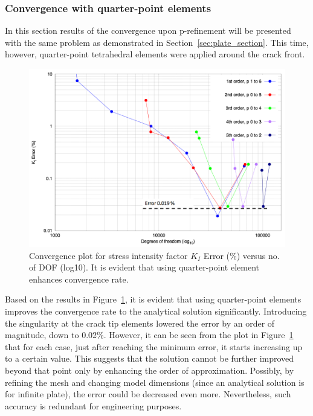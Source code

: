 \documentclass[11pt]{acmeArticle}
\numberwithin{equation}{section}
\begin{document}
\subsubsection{Convergence with quarter-point elements}
In this section results of the convergence upon p-refinement will be presented with the same problem as demonstrated in Section~\ref{sec:plate_section}. 
This time, however, quarter-point tetrahedral elements were applied around the crack front.
\begin{figure}[h!]
	\centering
	\includegraphics[width=0.7\linewidth]{Figures/graphs/plate_conv_singularity.png}
	\caption{Convergence plot for stress intensity factor $K_I$ Error (\%) versus no. of DOF (log10). It is evident that using quarter-point element enhances convergence rate.}
	\label{fig:plate_conv_singularity}
\end{figure}
Based on the results in Figure~\ref{fig:plate_conv_singularity}, it is evident that using quarter-point elements improves the convergence rate to the analytical solution significantly. 
Introducing the singularity at the crack tip elements lowered the error by an order of magnitude, down to 0.02\%. 
However, it can be seen from the plot in Figure~\ref{fig:plate_conv_singularity} that for each case, just after reaching the minimum error, it starts increasing up to a certain value. 
This suggests that the solution cannot be further improved beyond that point only by enhancing the order of approximation. 
Possibly, by refining the mesh and changing model dimensions (since an analytical solution is for infinite plate), the error could be decreased even more. 
Nevertheless, such accuracy is redundant for engineering purposes. \\ %
\end{document}
